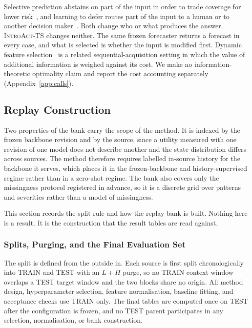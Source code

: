 \documentclass{article}
\newcommand{\introact}{\textsc{IntroAct-TS}}
\begin{document}
Selective prediction abstains on part of the input in order to trade coverage for lower
risk~\citep{chow1970optimum,vovk2005algorithmic,geifman2017selective,lei2018distribution}, and
learning to defer routes part of the input to a human or to another decision
maker~\citep{madras2018predict,mozannar2020consistent}. Both change who or what produces the
answer. \introact{} changes neither. The same frozen forecaster returns a forecast in every
case, and what is selected is whether the input is modified first. Dynamic feature
selection~\citep{he2024dime} is a related sequential-acquisition setting in which the value of
additional information is weighed against its cost. We make no information-theoretic
optimality claim and report the cost accounting separately (Appendix~\ref{app:calls}).

\subsection{Replay Construction}
\label{app:replay}
Two properties of the bank carry the scope of the method. It is indexed by the frozen backbone
revision and by the source, since a utility measured with one revision of one model does not
describe another and the state distribution differs across sources. The method therefore
requires labelled in-source history for the backbone it serves, which places it in the
frozen-backbone and history-supervised regime rather than in a zero-shot regime. The bank also
covers only the missingness protocol registered in advance, so it is a discrete grid over
patterns and severities rather than a model of missingness.

This section records the split rule and how the replay bank is built. Nothing here is a
result. It is the construction that the result tables are read against.

\subsubsection{Splits, Purging, and the Final Evaluation Set}
\label{app:splits}
The split is defined from the outside in. Each source is first split chronologically into
TRAIN and TEST with an $L + H$ purge, so no TRAIN context window overlaps a TEST target window
and the two blocks share no origin. All method design, hyperparameter selection, feature
normalisation, baseline fitting, and acceptance checks use TRAIN only. The final tables are
computed once on TEST after the configuration is frozen, and no TEST parent participates in
any selection, normalisation, or bank construction.
\end{document}
